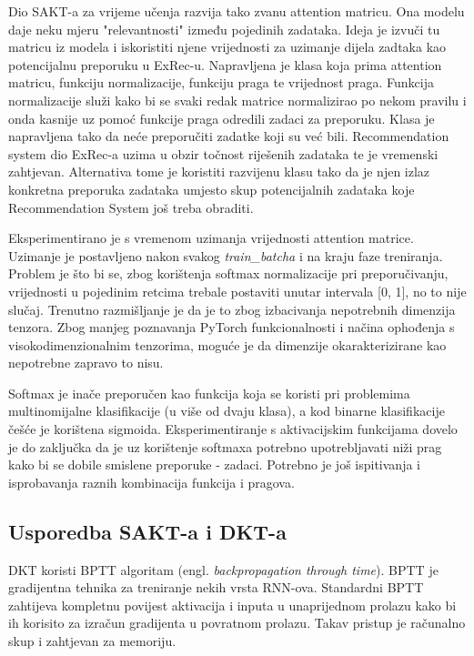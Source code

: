 		Dio SAKT-a za vrijeme učenja razvija tako zvanu attention matricu. Ona modelu daje neku mjeru "relevantnosti" između pojedinih zadataka. Ideja je izvuči tu matricu iz modela i iskoristiti njene vrijednosti za uzimanje dijela zadtaka kao potencijalnu preporuku u ExRec-u. Napravljena je klasa koja prima attention matricu, funkciju normalizacije, funkciju praga te vrijednost praga. Funkcija normalizacije služi kako bi se svaki redak matrice normalizirao po nekom pravilu i onda kasnije uz pomoć funkcije praga odredili zadaci za preporuku. Klasa je napravljena tako da neće preporučiti zadatke koji su već bili. Recommendation system dio ExRec-a uzima u obzir točnost riješenih zadataka te je vremenski zahtjevan. Alternativa tome je koristiti razvijenu klasu tako da je njen izlaz konkretna preporuka zadataka umjesto skup potencijalnih zadataka koje Recommendation System još treba obraditi. 

		Eksperimentirano je s vremenom uzimanja vrijednosti attention matrice. Uzimanje je postavljeno nakon svakog \textit{train\_batcha} i na kraju faze treniranja. Problem je što bi se, zbog korištenja softmax normalizacije pri preporučivanju, vrijednosti u pojedinim retcima trebale postaviti unutar intervala [0, 1], no to nije slučaj. Trenutno razmišljanje je da je to zbog izbacivanja nepotrebnih dimenzija tenzora. Zbog manjeg poznavanja PyTorch funkcionalnosti i načina ophođenja s visokodimenzionalnim tenzorima, moguće je da dimenzije okarakterizirane kao nepotrebne zapravo to nisu.

		Softmax je inače preporučen kao funkcija koja se koristi pri problemima multinomijalne klasifikacije (u više od dvaju klasa), a kod binarne klasifikacije češće je korištena sigmoida. Eksperimentiranje s aktivacijskim funkcijama dovelo je do zaključka da je uz korištenje softmaxa potrebno upotrebljavati niži prag kako bi se dobile smislene preporuke - zadaci. Potrebno je još ispitivanja i isprobavanja raznih kombinacija funkcija i pragova.

		\subsection{Usporedba SAKT-a i DKT-a}

		DKT koristi BPTT algoritam (engl. \textit{backpropagation through time}). BPTT je gradijentna tehnika za treniranje nekih vrsta RNN-ova. Standardni BPTT zahtijeva kompletnu povijest aktivacija i inputa u unaprijednom prolazu kako bi ih korisito za izračun gradijenta u povratnom prolazu. Takav pristup je računalno skup i zahtjevan za memoriju.

